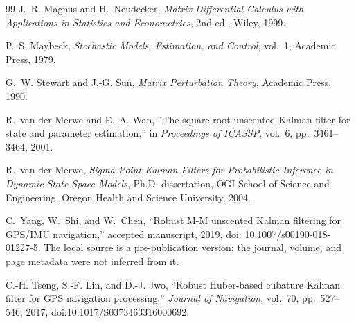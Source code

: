 \documentclass[11pt]{article}
\begin{document}
\begin{thebibliography}{99}
J.~R. Magnus and H.~Neudecker, \emph{Matrix Differential Calculus with
Applications in Statistics and Econometrics}, 2nd ed., Wiley, 1999.

P.~S. Maybeck, \emph{Stochastic Models, Estimation, and Control}, vol.~1,
Academic Press, 1979.

G.~W. Stewart and J.-G. Sun, \emph{Matrix Perturbation Theory}, Academic Press,
1990.

R.~van der Merwe and E.~A. Wan, ``The square-root unscented Kalman filter for
state and parameter estimation,'' in \emph{Proceedings of ICASSP}, vol.~6,
pp.~3461--3464, 2001.

R.~van der Merwe, \emph{Sigma-Point Kalman Filters for Probabilistic Inference
in Dynamic State-Space Models}, Ph.D. dissertation, OGI School of Science and
Engineering, Oregon Health and Science University, 2004.

C.~Yang, W.~Shi, and W.~Chen, ``Robust M-M unscented Kalman filtering for
GPS/IMU navigation,'' accepted manuscript, 2019, doi:
10.1007/s00190-018-01227-5.  The local source is a pre-publication version; the
journal, volume, and page metadata were not inferred from it.

C.-H. Tseng, S.-F. Lin, and D.-J. Jwo, ``Robust Huber-based cubature Kalman
filter for GPS navigation processing,'' \emph{Journal of Navigation}, vol.~70,
pp.~527--546, 2017, doi:10.1017/S0373463316000692.

\end{thebibliography}
\end{document}

